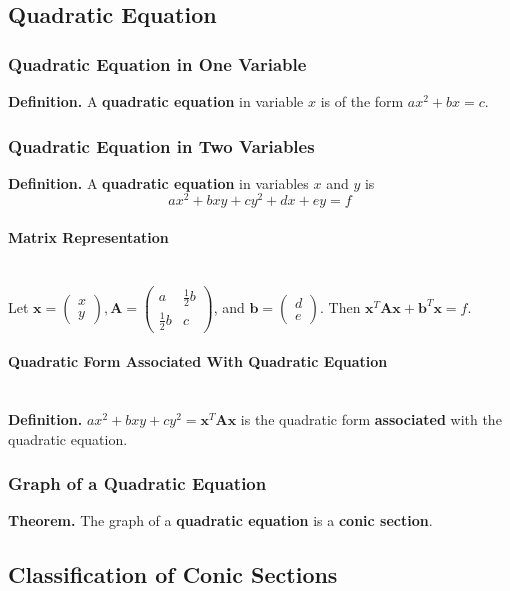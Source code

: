 \documentclass[../ma2001_notes.tex]{subfiles}
\begin{document}
\subsection{Quadratic Equation}
\subsubsection{Quadratic Equation in One Variable}
\textbf{Definition.} A \textbf{quadratic equation} in variable \(x\) is of the form \(ax^2+bx=c\).

\subsubsection{Quadratic Equation in Two Variables}
\textbf{Definition.} A \textbf{quadratic equation} in variables \(x\) and \(y\) is
\[ax^2+bxy+cy^2+dx+ey=f\]

\paragraph{Matrix Representation}\,\\
Let \(\bm{x}=\begin{pmatrix}
	x \\ y
\end{pmatrix},\bm{A}=\begin{pmatrix}
	a & \frac{1}{2}b \\ \frac{1}{2}b & c
\end{pmatrix}\), and \(\bm{b}=\begin{pmatrix}
	d \\ e
\end{pmatrix}\). Then \(\bm{x}^T\bm{Ax}+\bm{b}^T\bm{x}=f\).

\paragraph{Quadratic Form Associated With Quadratic Equation}\,\\
\textbf{Definition.} \(ax^2+bxy+cy^2=\bm{x}^T\bm{Ax}\) is the quadratic form \textbf{associated} with the quadratic equation.

\subsubsection{Graph of a Quadratic Equation}
\textbf{Theorem.} The graph of a \textbf{quadratic equation} is a \textbf{conic section}.

\subsection{Classification of Conic Sections}
\end{document}
